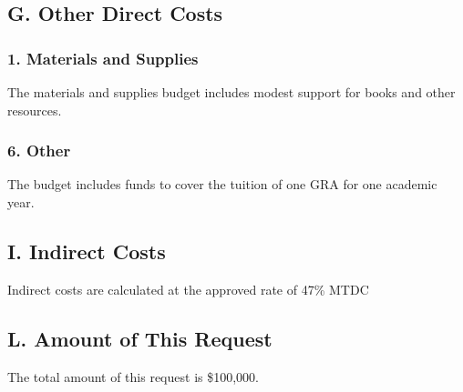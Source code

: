 \subsection*{G. Other Direct Costs}

\subsubsection*{1. Materials and Supplies}

The materials and supplies budget includes modest support for books and other resources.

\subsubsection*{6. Other}

The budget includes funds to cover the tuition of one GRA for one academic year.

\subsection*{I. Indirect Costs}

Indirect costs are calculated at the approved rate of 47\% MTDC

\subsection*{L. Amount of This Request}

The total amount of this request is \$100,000.

